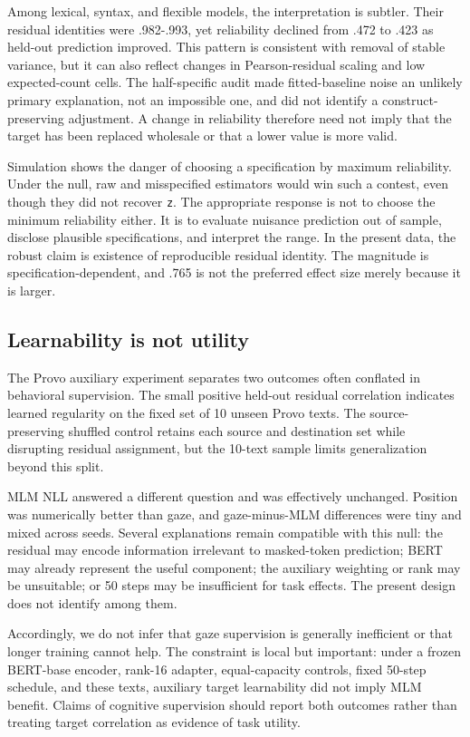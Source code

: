 \documentclass[11pt]{article}
\begin{document}
Among lexical, syntax, and flexible models, the interpretation is subtler. Their residual identities were .982-.993, yet reliability declined from .472 to .423 as held-out prediction improved. This pattern is consistent with removal of stable variance, but it can also reflect changes in Pearson-residual scaling and low expected-count cells. The half-specific audit made fitted-baseline noise an unlikely primary explanation, not an impossible one, and did not identify a construct-preserving adjustment. A change in reliability therefore need not imply that the target has been replaced wholesale or that a lower value is more valid.

Simulation shows the danger of choosing a specification by maximum reliability. Under the null, raw and misspecified estimators would win such a contest, even though they did not recover \texttt{z}. The appropriate response is not to choose the minimum reliability either. It is to evaluate nuisance prediction out of sample, disclose plausible specifications, and interpret the range. In the present data, the robust claim is existence of reproducible residual identity. The magnitude is specification-dependent, and .765 is not the preferred effect size merely because it is larger.

\subsection{Learnability is not utility}

The Provo auxiliary experiment separates two outcomes often conflated in behavioral supervision. The small positive held-out residual correlation indicates learned regularity on the fixed set of 10 unseen Provo texts. The source-preserving shuffled control retains each source and destination set while disrupting residual assignment, but the 10-text sample limits generalization beyond this split.

MLM NLL answered a different question and was effectively unchanged. Position was numerically better than gaze, and gaze-minus-MLM differences were tiny and mixed across seeds. Several explanations remain compatible with this null: the residual may encode information irrelevant to masked-token prediction; BERT may already represent the useful component; the auxiliary weighting or rank may be unsuitable; or 50 steps may be insufficient for task effects. The present design does not identify among them.

Accordingly, we do not infer that gaze supervision is generally inefficient or that longer training cannot help. The constraint is local but important: under a frozen BERT-base encoder, rank-16 adapter, equal-capacity controls, fixed 50-step schedule, and these texts, auxiliary target learnability did not imply MLM benefit. Claims of cognitive supervision should report both outcomes rather than treating target correlation as evidence of task utility.
\end{document}
